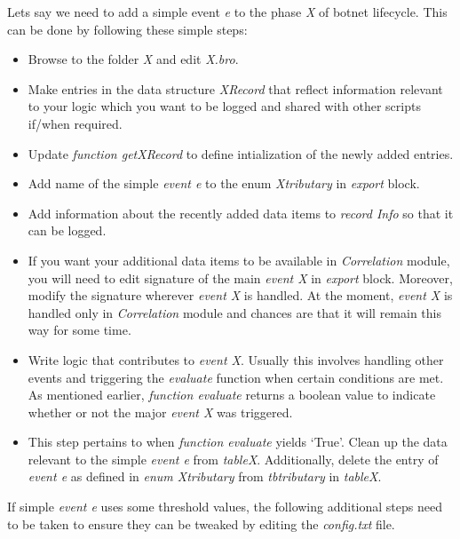 \documentclass[acmtocl]{acmtrans2m}
\begin{document}
Lets say we need to add a simple event \textit{e} to the phase
\textit{X} of botnet lifecycle. This can be done by following these
simple steps:
\begin{itemize}
\item Browse to the folder \textit{X} and edit \textit{X.bro}.
\item Make entries in the data structure \textit{XRecord}
that reflect information relevant to your logic which
you want to be logged and shared with other scripts if/when
required.
\item Update \textit{function getXRecord} to define intialization
of the newly added entries.
\item Add name of the simple \textit{event e} to the enum \textit{X\textunderscore tributary}
in \textit{export} block.
\item Add information about the recently added data items to
\textit{record Info} so that it can be logged.
\item If you want your additional data items to be available
in \textit{Correlation} module, you will need to edit signature of the 
main \textit{event X} in \textit{export} block. Moreover, modify the 
signature wherever \textit{event X} is handled. At the moment,
\textit{event X} is handled only in \textit{Correlation} module
and chances are that it will remain this way for some time.
  
\item Write logic that contributes to \textit{event X}.
Usually this involves handling other events and triggering
the \textit{evaluate} function when certain conditions are met.
As mentioned earlier, \textit{function evaluate} returns a
boolean value to indicate whether or not the major
\textit{event X} was triggered. 
\item This step pertains to when \textit{function evaluate}
yields `True'. Clean up the data relevant to the simple 
\textit{event e} from \textit{table\textunderscore X}. Additionally, delete the entry of 
\textit{event e} as defined in \textit{enum X\textunderscore tributary} from 
\textit{tb\textunderscore tributary} in \textit{table\textunderscore X}.  
\end{itemize}
If simple \textit{event e} uses some threshold values, the
following additional steps need to be taken to ensure they 
can be tweaked by editing the \textit{config.txt} file.
\end{document}
